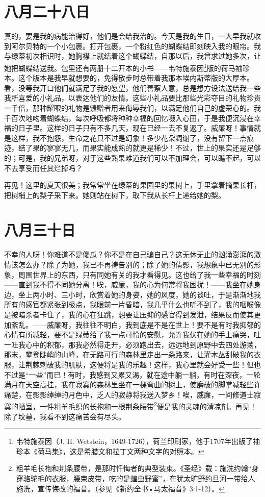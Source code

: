 \documentclass[12pt,oneside]{book}
\begin{document}
\chapter{八月二十八日}
真的，要是我的病能治得好，他们是会给我治的。今天是我的生日，一大早我就收到阿尔贝特的一个小包裹。打开包裹，一个粉红色的蝴蝶结即刻映入我的眼帘。我与绿蒂初次相识时，她胸襟上就结着这个蝴蝶结，自那以后，我曾求过她多次，让她把蝴蝶结送我。包里还有两册十二开本的小书——韦特施泰因\footnote{韦特施泰因（J. H. Wetstein，1649-1726），荷兰印刷家，他于1707年出版了袖珍本《荷马集》，这是希腊文和拉丁文两种文字的对照本。}版的荷马袖珍本。这个版本是我早就想要的，免得散步时总带着我那本埃内斯蒂版的大厚本。看，没等我开口他们就满足了我的愿望，他们善察人意，总是想方设法送给我一些我所喜爱的小礼品，以表达他们的友情。这些小礼品要比那些光彩夺目的礼物珍贵一千倍，那种耀眼的礼物是馈赠者用来侮辱我们，以满足他们自己的虚荣心的。我千百次地吻着蝴蝶结，每次呼吸都将种种幸福的回忆啜入心田，于是我便沉浸在幸福的日子里。这样的日子只有不多几天，现在已经一去不复返了。威廉呀！事情就是这样，我不抱怨，生命之花只不过是幻象！多少花朵凋谢了，没有留下一点痕迹，结了果的寥寥无几，而果实能成熟的就更是稀少！不过，世上的果实还是足够的；可是，我的兄弟呀，对于这些熟果难道我们可以不加理会，可以瞧不起，可以不去享受而任其烂掉吗？

再见！这里的夏天很美；我常常坐在绿蒂的果园里的果树上，手里拿着摘果长杆，把树梢上的梨子采下来。她则站在树下，取下我从长杆上递给她的梨。
　　

\chapter{八月三十日}
不幸的人呀！你难道不是傻瓜？你不是在自己骗自己？这无休无止的汹涌澎湃的激情该怎么办？除了为她，我已不再祷告别的；除了她的倩影，我想象中已无别的形象，周围世界上的东西，只有同她有关的我才看得见。这也给了我一些幸福的时刻——直到我不得不同她分离！唉，威廉，我的心为何常将我困扰！——我坐在她身边，坐上两小时、三小时，欣赏着她的身姿，她的风度，她的谈吐，于是渐渐地我所有的感官都紧张到极点，我眼前一片昏暗，我几乎什么也听不到了，我的咽喉像是被暗杀者卡住了，我的心在狂跳，想要让压抑的感官得到发泄，结果反而使其更加紊乱。——威廉呀，我往往不明白，我到底是不是在世上！要不是有时我抑郁的心情有所减轻，要不是绿蒂给了我一点可怜的安慰，允许我伏在她的手上痛哭，吐一吐我心中的积郁，那我必然得走开，必须跑出去，远远地到原野中去四处游荡，那末，攀登陡峭的山峰，在无路可行的森林里走出一条路来，让灌木丛刮破我的衣服，让荆棘刺破我的肌肤，这便将是我的乐趣！这样，我心里就会好受一些！但也不过是“一些”而已！有时，我感到又累又渴，就在途中躺一躺，有时在深夜，一轮满月在天空高挂，我在寂寞的森林里坐在一棵弯曲的树上，使磨破的脚掌减轻些许痛楚，在影影绰绰的月色中，乏人的寂静将我送入梦乡！唉，威廉，一间修道士寂寞的陋室，一件粗羊毛织的长袍和一根荆条腰带\footnote{粗羊毛长袍和荆条腰带，是那时忏悔者的典型装束。《圣经》载：施洗约翰“身穿骆驼毛的衣服，腰束皮带，吃的是蝗虫野蜜”，在犹太旷野约旦河一带给人施洗，宣传悔改的福音。（参见《新约全书•马太福音》3:1-12）。}便是我的灵魂的清凉剂。再见！除了坟墓，我看不到这痛苦会有尽头。
\end{document}
